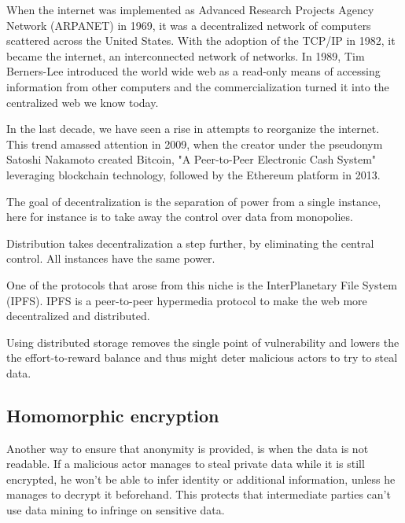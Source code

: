 When the internet was implemented as Advanced Research Projects Agency Network (ARPANET) in 1969, it was a decentralized network of computers scattered across the United States. With the adoption of the TCP/IP in 1982, it became the internet, an interconnected network of networks.
In 1989, Tim Berners-Lee introduced the world wide web as a read-only means of accessing information from other computers and the commercialization turned it into the centralized web we know today. 

In the last decade, we have seen a rise in attempts to reorganize the internet. This trend amassed attention in 2009, when the creator under the pseudonym Satoshi Nakamoto created Bitcoin, "A Peer-to-Peer Electronic Cash System" leveraging blockchain technology, followed by the Ethereum platform in 2013.

The goal of decentralization is the separation of power from a single instance, here for instance is to take away the control over data from monopolies. 

Distribution takes decentralization a step further, by eliminating the central control. All instances have the same power. 

One of the protocols that arose from this niche is the InterPlanetary File System (IPFS). IPFS is a peer-to-peer hypermedia protocol to make the web more decentralized and distributed.

Using distributed storage removes the single point of vulnerability and lowers the the effort-to-reward balance and thus might deter malicious actors to try to steal data.

\subsection{Homomorphic encryption}
Another way to ensure that anonymity is provided, is when the data is not readable. If a malicious actor manages to steal private data while it is still encrypted, he won't be able to infer identity or additional information, unless he manages to decrypt it beforehand. This protects that intermediate parties can't use data mining to infringe on sensitive data.

